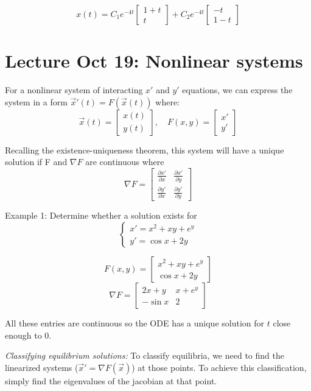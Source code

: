 \documentclass[12pt]{article}
\begin{document}
\[\boxed{x(t) = C_1 e^{-4t} \begin{bmatrix}
    1 + t\\
    t
\end{bmatrix} + C_2 e^{-4t} \begin{bmatrix}
    -t \\
    1- t
\end{bmatrix}}\]

\section{Lecture Oct 19: Nonlinear systems}
For a nonlinear system of interacting $x'$ and $y'$ equations, we can express the system in a form $\vec{x}'(t) = F(\vec{x}(t))$ where:
\[\vec{x}(t) = \begin{bmatrix}
    x(t)\\
    y(t)
\end{bmatrix}, \quad F(x, y) = \begin{bmatrix}
    x'\\
    y'
\end{bmatrix}\]

Recalling the existence-uniqueness theorem, this system will have a unique solution if F and $\nabla F$ are continuous where 
\[\nabla F = \begin{bmatrix}
    \frac{\partial x'}{\partial x} & \frac{\partial x'}{\partial y}\\
    \frac{\partial y'}{\partial x} & \frac{\partial y'}{\partial y}
\end{bmatrix}\]

Example 1: Determine whether a solution exists for 
\[\begin{cases}
    x' = x^2 + xy + e^y\\
    y' = \cos x + 2y
\end{cases}\]

\[F(x, y) = \begin{bmatrix}
    x^2 + xy + e^y\\
    \cos x + 2y
\end{bmatrix}\]
\[\nabla F = \begin{bmatrix}
    2x + y & x + e^y\\
    -\sin x & 2
\end{bmatrix}\]

All these entries are continuous so the ODE has a unique solution for $t$ close enough to 0.

\emph{Classifying equilibrium solutions:}
To classify equilibria, we need to find the linearized systems ($\vec{x}' = \nabla F(\vec{x})$) at those points. To achieve this classification, simply find the eigenvalues of the jacobian at that point.
\end{document}
